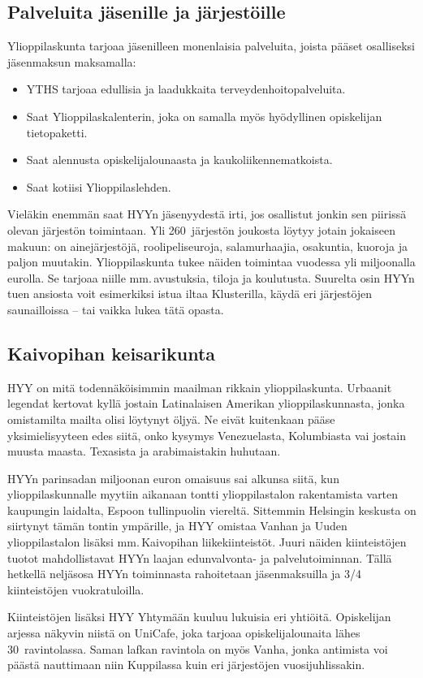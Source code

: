 \documentclass[a5paper, 8pt, twocolumn]{book} %
\numberwithin{equation}{section}
\begin{document}
\subsection*{Palveluita jäsenille ja järjestöille}
Ylioppilaskunta tarjoaa jäsenilleen monenlaisia
palveluita, joista pääset osalliseksi
jäsenmaksun maksamalla:
\begin{itemize}
\item YTHS tarjoaa edullisia ja laadukkaita
terveydenhoitopalveluita.
\item Saat Ylioppilaskalenterin, joka on
samalla myös hyödyllinen opiskelijan
tietopaketti.
\item Saat alennusta opiskelijalounaasta ja kauko\-liikenne\-matkoista.
\item Saat kotiisi Ylioppilaslehden.
\end{itemize}
Vieläkin enemmän saat HYYn jäsenyydestä
irti, jos osallistut jonkin sen piirissä
olevan järjestön toimintaan. Yli 260~järjestön
joukosta löytyy jotain jokaiseen makuun:
on ainejärjestöjä, roolipeliseuroja, salamurhaajia, osakuntia, kuoroja ja paljon
muutakin. Ylioppilaskunta tukee näiden
toimintaa vuodessa yli miljoonalla eurolla.
Se tarjoaa niille mm.\,avustuksia, tiloja ja
koulutusta. Suurelta osin HYYn tuen ansiosta
voit esimerkiksi istua iltaa Klusterilla,
käydä eri järjestöjen saunailloissa -- tai
vaikka lukea tätä opasta.
\subsection*{Kaivopihan keisarikunta}
HYY on mitä todennäköisimmin maailman
rikkain ylioppilaskunta. Urbaanit
legendat kertovat kyllä jostain Latinalaisen
Amerikan ylioppilaskunnasta,
jonka omistamilta mailta olisi
löytynyt öljyä. Ne eivät kuitenkaan
pääse yksimielisyyteen
edes siitä, onko
kysymys Venezuelasta,
Kolumbiasta
vai jostain muusta
maasta. Texasista
ja arabimaistakin
huhutaan.

HYYn parinsadan
miljoonan euron omaisuus
sai alkunsa siitä, kun
ylioppilaskunnalle myytiin
aikanaan tontti ylioppilastalon
rakentamista varten kaupungin laidalta,
Espoon tullinpuolin viereltä. Sittemmin
Helsingin keskusta on siirtynyt tämän
tontin ympärille, ja HYY omistaa Vanhan
ja Uuden ylioppilastalon lisäksi mm.\,Kaivopihan liikekiinteistöt. Juuri näiden
kiinteistöjen tuotot mahdollistavat HYYn
laajan edunvalvonta- ja palvelutoiminnan.
Tällä hetkellä neljäsosa HYYn toiminnasta
rahoitetaan jäsenmaksuilla ja 3/4 kiinteistöjen
vuokratuloilla.

Kiinteistöjen lisäksi HYY Yhtymään
kuuluu lukuisia eri yhtiöitä. Opiskelijan arjessa
näkyvin niistä on UniCafe, joka tarjoaa
opiskelijalounaita lähes 30~ravintolassa.
Saman lafkan ravintola on myös Vanha,
jonka antimista voi päästä nauttimaan niin
Kuppilassa kuin eri järjestöjen vuosijuhlissakin.
\end{document}

